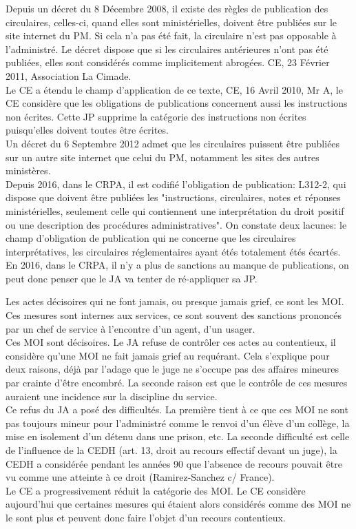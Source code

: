\documentclass[10pt, a4paper, openany]{book}
\begin{document}
Depuis un décret du 8 Décembre 2008, il existe des règles de publication des circulaires, celles-ci, quand elles sont ministérielles, doivent être publiées sur le site internet du PM. Si cela n'a pas été fait, la circulaire n'est pas opposable à l'administré. Le décret dispose que si les circulaires antérieures n'ont pas été publiées, elles sont considérés comme implicitement abrogées. CE, 23 Février 2011, Association La Cimade. \\
Le CE a étendu le champ d'application de ce texte, CE, 16 Avril 2010, Mr A, le CE considère que les obligations de publications concernent aussi les instructions non écrites. Cette JP supprime la catégorie des instructions non écrites puisqu'elles doivent toutes être écrites. \\
Un décret du 6 Septembre 2012 admet que les circulaires puissent être publiées sur un autre site internet que celui du PM, notamment les sites des autres ministères. \\
Depuis 2016, dans le CRPA, il est codifié l'obligation de publication: L312-2, qui dispose que doivent être publiées les "instructions, circulaires, notes et réponses ministérielles, seulement celle qui contiennent une interprétation du droit positif ou une description des procédures administratives". On constate deux lacunes: le champ d'obligation de publication qui ne concerne que les circulaires interprétatives, les circulaires réglementaires ayant étés totalement étés écartés. En 2016, dans le CRPA, il n'y a plus de sanctions au manque de publications, on peut donc penser que le JA va tenter de ré-appliquer sa JP.


Les actes décisoires qui ne font jamais, ou presque jamais grief, ce sont les MOI. Ces mesures sont internes aux services, ce sont souvent des sanctions prononcés par un chef de service à l'encontre d'un agent, d'un usager. \\
Ces MOI sont décisoires. Le JA refuse de contrôler ces actes au contentieux, il considère qu'une MOI ne fait jamais grief au requérant. Cela s'explique pour deux raisons, déjà par l'adage que le juge ne s'occupe pas des affaires mineures par crainte d'être encombré. La seconde raison est que le contrôle de ces mesures auraient une incidence sur la discipline du service. \\
Ce refus du JA a posé des difficultés. La première tient à ce que ces MOI ne sont pas toujours mineur pour l'administré comme le renvoi d'un élève d'un collège, la mise en isolement d'un détenu dans une prison, etc. La seconde difficulté est celle de l'influence de la CEDH (art. 13, droit au recours effectif devant un juge), la CEDH a considérée pendant les années 90 que l'absence de recours pouvait être vu comme une atteinte à ce droit (Ramirez-Sanchez c/ France). \\
Le CE a progressivement réduit la catégorie des MOI. Le CE considère aujourd'hui que certaines mesures qui étaient alors considérés comme des MOI ne le sont plus et peuvent donc faire l'objet d'un recours contentieux.
\end{document}
